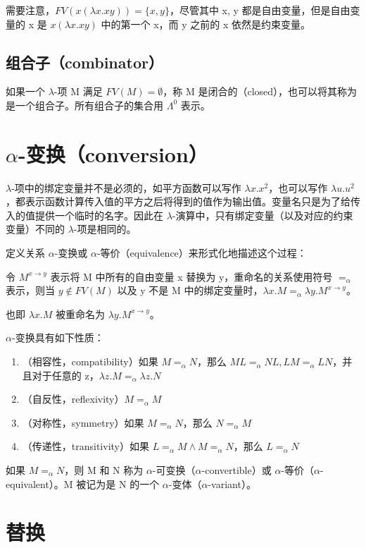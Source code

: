 \documentclass[UTF8]{article}
\begin{document}
	需要注意，$FV(x(\lambda x.xy)) = \{x, y\}$，尽管其中 x, y 都是自由变量，但是自由变量的 x 是 $x(\lambda x.xy)$ 中的第一个 x，而 y 之前的 x 依然是约束变量。

\subsection{组合子（combinator）}

	如果一个 $\lambda$-项 M 满足 $FV(M) = \emptyset$，称 M 是闭合的（closed），也可以将其称为是一个组合子。所有组合子的集合用 $\Lambda^0$ 表示。

\section{$\alpha$-变换（conversion）}

	$\lambda$-项中的绑定变量并不是必须的，如平方函数可以写作 $\lambda x. x^2$，也可以写作 $\lambda u. u^2$，都表示函数计算传入值的平方之后将得到的值作为输出值。变量名只是为了给传入的值提供一个临时的名字。因此在 $\lambda$-演算中，只有绑定变量（以及对应的约束变量）不同的 $\lambda$-项是相同的。

	定义关系 $\alpha$-变换或 $\alpha$-等价（equivalence）来形式化地描述这个过程：

	令 $M^{x\rightarrow y}$ 表示将 M 中所有的自由变量 x 替换为 y，重命名的关系使用符号 $=_{\alpha}$ 表示，则当 $y \notin FV(M)$ 以及 y 不是 M 中的绑定变量时，$\lambda x. M =_{\alpha} \lambda y. M^{x\rightarrow y}$。

	也即 $\lambda x. M$ 被重命名为 $\lambda y. M^{x\rightarrow y}$。

	$\alpha$-变换具有如下性质：
	\begin{enumerate} 
		\item （相容性，compatibility）如果 $M =_{\alpha} N$，那么 $ML =_\alpha NL, LM =_\alpha LN$，并且对于任意的 z，$\lambda z. M =_\alpha \lambda z. N$
		\item （自反性，reflexivity）$M =_\alpha M$
		\item （对称性，symmetry）如果 $M =_\alpha N$，那么 $N =_\alpha M$
		\item （传递性，transitivity）如果 $L =_\alpha M \land M =_\alpha N$，那么 $L =_\alpha N$
	\end{enumerate}

	如果 $M =_\alpha N$，则 M 和 N 称为 $\alpha$-可变换（$\alpha$-convertible）或 $\alpha$-等价（$\alpha$-equivalent）。M 被记为是 N 的一个 $\alpha$-变体（$\alpha$-variant）。

\section{替换}
\end{document}
